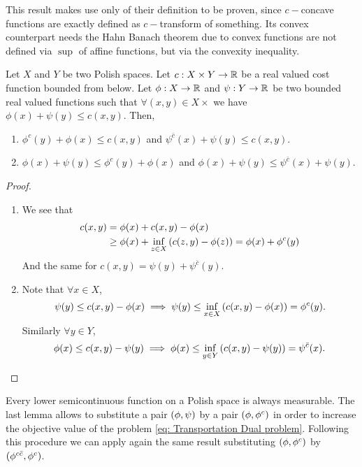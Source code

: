 This result makes use only of their definition to be proven, since $c-$concave functions are exactly defined as $c-$transform
of something. Its convex counterpart needs the Hahn Banach theorem due to convex functions are not defined via $\sup$ of affine functions, but via the
convexity inequality. 


\begin{lemma}
	Let $X$ and $Y$ be two Polish spaces. Let $c:X\times Y \rightarrow \mathbb{R}$ be a real valued cost function bounded from below. Let $\phi:X\rightarrow \mathbb{R}$ and $\psi:Y\rightarrow\mathbb{R}$ be two bounded real valued functions such that $\forall (x,y)\in X\times$ we have $\phi(x)+\psi(y)\leq c(x,y)$. Then, 
	\begin{enumerate}
		\item $\phi^c(y)+\phi(x)\leq c(x,y)$ and $\psi^{\bar c}(x)+\psi(y)\leq c(x,y)$. 
		\item $\phi(x)+\psi(y)\leq\phi^c(y)+\phi(x) $ and $\phi(x)+\psi(y)\leq\psi^{\bar c}(x)+\psi(y)$.
	\end{enumerate}
\end{lemma}

\begin{proof}

\begin{enumerate}
\item  We see that 
\begin{align*}
c(x,y)&=\phi(x)+c(x,y)-\phi(x)\\
		&\geq\phi(x)+\inf_{z\in X} \left( c(z,y)-\phi(z) \right)=\phi(x)+\phi^c(y)
\end{align*}
And the same for $c(x,y)=\psi(y)+\psi^{\bar c}(y)$.

\item  Note that $\forall x\in X$,
\begin{equation*}
\psi(y)\leq c(x,y)-\phi(x)\implies\psi(y)\leq \inf_{x\in X}\left( c(x,y)-\phi(x) \right)=\phi^c(y). 
\end{equation*}	
Similarly $\forall y \in Y$,
\begin{equation*}
\phi(x)\leq c(x,y)-\psi(y)\implies\phi(x)\leq\inf_{y\in Y}\left( c(x,y)-\psi(y) \right)=\psi^{\bar{c}}(x).
\end{equation*}	
\end{enumerate}	
	
\end{proof}
Every lower semicontinuous function on a Polish space is always measurable. The last lemma allows to substitute a pair $\left( \phi, \psi \right)$ by a pair $\left( \phi,\phi^c \right)$ in order to increase the objective value of the problem \eqref{eq: Transportation Dual problem}. Following this procedure we can  apply again the same result substituting $\left( \phi,\phi^c \right)$ by $\left( \phi^{c\bar c}, \phi^c \right)$.  \\

